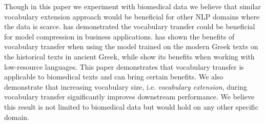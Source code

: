 \documentclass[11pt]{article}
\begin{document}
Though in this paper we experiment with biomedical data we believe that similar vocabulary extension approach would be beneficial for other NLP domains where the data is scarce. \cite{gee2022fast} has demonstrated the vocabulary transfer could be beneficial for model compression in business applications. \cite{yamshchikov2022bert} has shown the benefits of vocabulary transfer when using the model trained on the modern Greek texts on the historical texts in ancient Greek, while \cite{remy2024trans,alexandrov2024mitigating} show its benefits when working with low-resource languages. This paper demonstrates that vocabulary transfer is applicable to biomedical texts and can bring certain benefits. We also demonstrate that increasing vocabulary size, i.e. {\em vocabulary extension}, during vocabulary transfer significantly improves downstream performance. We believe this result is not limited to biomedical data but would hold on any other specific domain.

\end{document}
